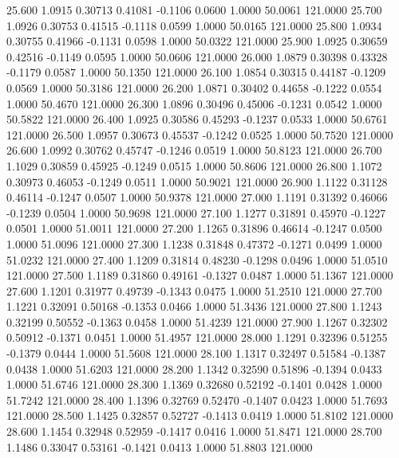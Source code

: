   25.600   1.0915   0.30713   0.41081  -0.1106   0.0600   1.0000  50.0061 121.0000
  25.700   1.0926   0.30753   0.41515  -0.1118   0.0599   1.0000  50.0165 121.0000
  25.800   1.0934   0.30755   0.41966  -0.1131   0.0598   1.0000  50.0322 121.0000
  25.900   1.0925   0.30659   0.42516  -0.1149   0.0595   1.0000  50.0606 121.0000
  26.000   1.0879   0.30398   0.43328  -0.1179   0.0587   1.0000  50.1350 121.0000
  26.100   1.0854   0.30315   0.44187  -0.1209   0.0569   1.0000  50.3186 121.0000
  26.200   1.0871   0.30402   0.44658  -0.1222   0.0554   1.0000  50.4670 121.0000
  26.300   1.0896   0.30496   0.45006  -0.1231   0.0542   1.0000  50.5822 121.0000
  26.400   1.0925   0.30586   0.45293  -0.1237   0.0533   1.0000  50.6761 121.0000
  26.500   1.0957   0.30673   0.45537  -0.1242   0.0525   1.0000  50.7520 121.0000
  26.600   1.0992   0.30762   0.45747  -0.1246   0.0519   1.0000  50.8123 121.0000
  26.700   1.1029   0.30859   0.45925  -0.1249   0.0515   1.0000  50.8606 121.0000
  26.800   1.1072   0.30973   0.46053  -0.1249   0.0511   1.0000  50.9021 121.0000
  26.900   1.1122   0.31128   0.46114  -0.1247   0.0507   1.0000  50.9378 121.0000
  27.000   1.1191   0.31392   0.46066  -0.1239   0.0504   1.0000  50.9698 121.0000
  27.100   1.1277   0.31891   0.45970  -0.1227   0.0501   1.0000  51.0011 121.0000
  27.200   1.1265   0.31896   0.46614  -0.1247   0.0500   1.0000  51.0096 121.0000
  27.300   1.1238   0.31848   0.47372  -0.1271   0.0499   1.0000  51.0232 121.0000
  27.400   1.1209   0.31814   0.48230  -0.1298   0.0496   1.0000  51.0510 121.0000
  27.500   1.1189   0.31860   0.49161  -0.1327   0.0487   1.0000  51.1367 121.0000
  27.600   1.1201   0.31977   0.49739  -0.1343   0.0475   1.0000  51.2510 121.0000
  27.700   1.1221   0.32091   0.50168  -0.1353   0.0466   1.0000  51.3436 121.0000
  27.800   1.1243   0.32199   0.50552  -0.1363   0.0458   1.0000  51.4239 121.0000
  27.900   1.1267   0.32302   0.50912  -0.1371   0.0451   1.0000  51.4957 121.0000
  28.000   1.1291   0.32396   0.51255  -0.1379   0.0444   1.0000  51.5608 121.0000
  28.100   1.1317   0.32497   0.51584  -0.1387   0.0438   1.0000  51.6203 121.0000
  28.200   1.1342   0.32590   0.51896  -0.1394   0.0433   1.0000  51.6746 121.0000
  28.300   1.1369   0.32680   0.52192  -0.1401   0.0428   1.0000  51.7242 121.0000
  28.400   1.1396   0.32769   0.52470  -0.1407   0.0423   1.0000  51.7693 121.0000
  28.500   1.1425   0.32857   0.52727  -0.1413   0.0419   1.0000  51.8102 121.0000
  28.600   1.1454   0.32948   0.52959  -0.1417   0.0416   1.0000  51.8471 121.0000
  28.700   1.1486   0.33047   0.53161  -0.1421   0.0413   1.0000  51.8803 121.0000
